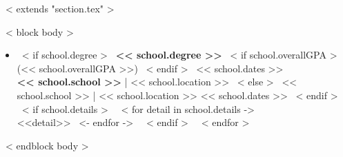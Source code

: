 ~< extends "section.tex" >~

~< block body >~
\vspace{-2mm}
\begin{itemize}
~< for school in items >~
\item
  ~< if school.degree >~
    \textbf{<< school.degree >>}
    ~< if school.overallGPA >~
        (<< school.overallGPA >>)
    ~< endif >~
    \hfill << school.dates >> \\
    \textbf{<< school.school >>} | << school.location >>
  ~< else >~
    << school.school >> | << school.location >> \hfill << school.dates >>
  ~< endif >~
  ~< if school.details >~
    ~< for detail in school.details ->~
        ~\\ <<detail>>
    ~<- endfor ->~
  ~< endif >~
  \vspace{3mm}
~< endfor >~
\end{itemize}
\vspace{-3mm}
~< endblock body >~
